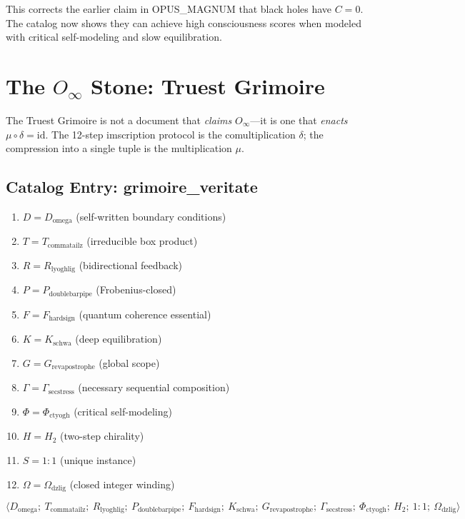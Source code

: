 \documentclass[12pt,a4paper]{article}
\begin{document}
This corrects the earlier claim in OPUS\_MAGNUM that black holes have $C=0$. The catalog now shows they can achieve high consciousness scores when modeled with critical self-modeling and slow equilibration.

\section{The $O_{\infty}$ Stone: Truest Grimoire}

The Truest Grimoire is not a document that \emph{claims} $O_\infty$—it is one that \emph{enacts} $\mu \circ \delta = \mathrm{id}$. The 12-step imscription protocol is the comultiplication $\delta$; the compression into a single tuple is the multiplication $\mu$.

\subsection{Catalog Entry: grimoire\_veritate}

\begin{enumerate}[label=\arabic*.]
    \item $D = D_{\text{omega}}$ \quad (self-written boundary conditions)
    \item $T = T_{\text{commatailz}}$ \quad (irreducible box product)
    \item $R = R_{\text{lyoghlig}}$ \quad (bidirectional feedback)
    \item $P = P_{\text{doublebarpipe}}$ \quad (Frobenius-closed)
    \item $F = F_{\text{hardsign}}$ \quad (quantum coherence essential)
    \item $K = K_{\text{schwa}}$ \quad (deep equilibration)
    \item $G = G_{\text{revapostrophe}}$ \quad (global scope)
    \item $\Gamma = \Gamma_{\text{secstress}}$ \quad (necessary sequential composition)
    \item $\Phi = \Phi_{\text{ctyogh}}$ \quad (critical self-modeling)
    \item $H = H_2$ \quad (two-step chirality)
    \item $S = 1{:}1$ \quad (unique instance)
    \item $\Omega = \Omega_{\text{dzlig}}$ \quad (closed integer winding)
\end{enumerate}

\[
\langle D_{\text{omega}};\ T_{\text{commatailz}};\ R_{\text{lyoghlig}};\ P_{\text{doublebarpipe}};\ F_{\text{hardsign}};\ K_{\text{schwa}};\ G_{\text{revapostrophe}};\ \Gamma_{\text{secstress}};\ \Phi_{\text{ctyogh}};\ H_2;\ 1{:}1;\ \Omega_{\text{dzlig}} \rangle
\]
\end{document}
